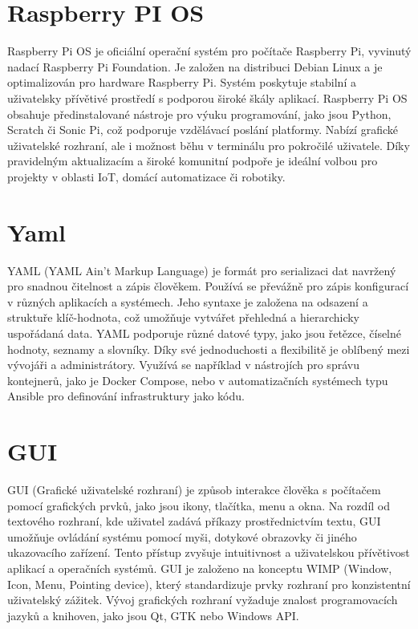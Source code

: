 \section{Raspberry PI OS}\label{sec:rpi-os}
Raspberry Pi OS je oficiální operační systém pro počítače Raspberry Pi, vyvinutý nadací Raspberry Pi Foundation. Je založen na distribuci Debian Linux a je optimalizován pro hardware Raspberry Pi. Systém poskytuje stabilní a uživatelsky přívětivé prostředí s podporou široké škály aplikací. Raspberry Pi OS obsahuje předinstalované nástroje pro výuku programování, jako jsou Python, Scratch či Sonic Pi, což podporuje vzdělávací poslání platformy. Nabízí grafické uživatelské rozhraní, ale i možnost běhu v terminálu pro pokročilé uživatele. Díky pravidelným aktualizacím a široké komunitní podpoře je ideální volbou pro projekty v oblasti IoT, domácí automatizace či robotiky.


\section{Yaml}\label{sec:yaml}
YAML (YAML Ain't Markup Language) je formát pro serializaci dat navržený pro snadnou čitelnost a zápis člověkem. Používá se převážně pro zápis konfigurací v různých aplikacích a systémech. Jeho syntaxe je založena na odsazení a struktuře klíč-hodnota, což umožňuje vytvářet přehledná a hierarchicky uspořádaná data. YAML podporuje různé datové typy, jako jsou řetězce, číselné hodnoty, seznamy a slovníky. Díky své jednoduchosti a flexibilitě je oblíbený mezi vývojáři a administrátory. Využívá se například v nástrojích pro správu kontejnerů, jako je Docker Compose, nebo v automatizačních systémech typu Ansible pro definování infrastruktury jako kódu.


\section{GUI}\label{sec:gui}
GUI (Grafické uživatelské rozhraní) je způsob interakce člověka s počítačem pomocí grafických prvků, jako jsou ikony, tlačítka, menu a okna. Na rozdíl od textového rozhraní, kde uživatel zadává příkazy prostřednictvím textu, GUI umožňuje ovládání systému pomocí myši, dotykové obrazovky či jiného ukazovacího zařízení. Tento přístup zvyšuje intuitivnost a uživatelskou přívětivost aplikací a operačních systémů. GUI je založeno na konceptu WIMP (Window, Icon, Menu, Pointing device), který standardizuje prvky rozhraní pro konzistentní uživatelský zážitek. Vývoj grafických rozhraní vyžaduje znalost programovacích jazyků a knihoven, jako jsou Qt, GTK nebo Windows API.


